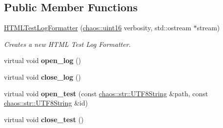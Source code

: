 \subsection*{Public Member Functions}
\begin{DoxyCompactItemize}
\item 
\hypertarget{classchaos_1_1test_1_1log__formatter_1_1_h_t_m_l_test_log_formatter_aa48a171c811fb1ec3915f0898a8404fa}{\hyperlink{classchaos_1_1test_1_1log__formatter_1_1_h_t_m_l_test_log_formatter_aa48a171c811fb1ec3915f0898a8404fa}{H\-T\-M\-L\-Test\-Log\-Formatter} (\hyperlink{namespacechaos_ac3888b1c9e56da7fbbdb3ab8425b4068}{chaos\-::uint16} verbosity, std\-::ostream $\ast$stream)}\label{classchaos_1_1test_1_1log__formatter_1_1_h_t_m_l_test_log_formatter_aa48a171c811fb1ec3915f0898a8404fa}

\begin{DoxyCompactList}\small\item\em Creates a new H\-T\-M\-L Test Log Formatter. \end{DoxyCompactList}\item 
\hypertarget{classchaos_1_1test_1_1log__formatter_1_1_h_t_m_l_test_log_formatter_a60da960b069095f4df29d02ede1f4b78}{virtual void {\bfseries open\-\_\-log} ()}\label{classchaos_1_1test_1_1log__formatter_1_1_h_t_m_l_test_log_formatter_a60da960b069095f4df29d02ede1f4b78}

\item 
\hypertarget{classchaos_1_1test_1_1log__formatter_1_1_h_t_m_l_test_log_formatter_a590f4ba75c06576df9b07720fbcc851e}{virtual void {\bfseries close\-\_\-log} ()}\label{classchaos_1_1test_1_1log__formatter_1_1_h_t_m_l_test_log_formatter_a590f4ba75c06576df9b07720fbcc851e}

\item 
\hypertarget{classchaos_1_1test_1_1log__formatter_1_1_h_t_m_l_test_log_formatter_a8b8e1cefd176eca4680b407eea5f42cc}{virtual void {\bfseries open\-\_\-test} (const \hyperlink{classchaos_1_1str_1_1_u_t_f8_string}{chaos\-::str\-::\-U\-T\-F8\-String} \&path, const \hyperlink{classchaos_1_1str_1_1_u_t_f8_string}{chaos\-::str\-::\-U\-T\-F8\-String} \&id)}\label{classchaos_1_1test_1_1log__formatter_1_1_h_t_m_l_test_log_formatter_a8b8e1cefd176eca4680b407eea5f42cc}

\item 
\hypertarget{classchaos_1_1test_1_1log__formatter_1_1_h_t_m_l_test_log_formatter_a50aa9b6f10663fd15c3b08535704429d}{virtual void {\bfseries close\-\_\-test} ()}\label{classchaos_1_1test_1_1log__formatter_1_1_h_t_m_l_test_log_formatter_a50aa9b6f10663fd15c3b08535704429d}


\end{DoxyCompactItemize}
